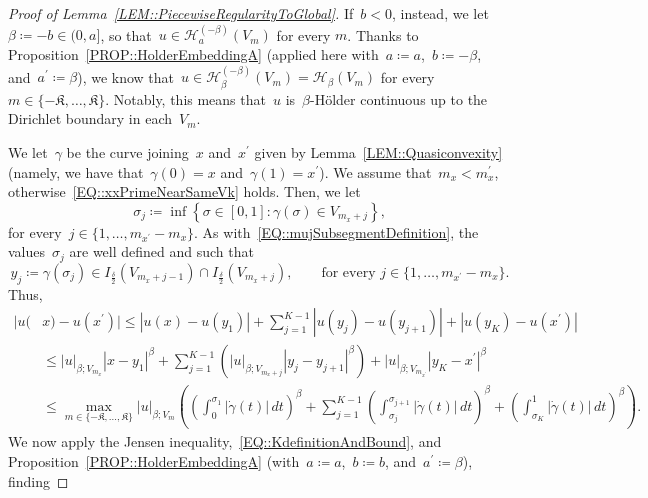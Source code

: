 \documentclass[12pt,a4paper]{amsart}
\numberwithin{equation}{section}
\theoremstyle{definition}
\theoremstyle{remark}
\newcommand{\abs}[1]{\left\lvert#1\right\rvert}
\renewcommand{\leq}{\leqslant}
\begin{document}
\begin{appendix}
\begin{proof}[Proof of Lemma~\ref{LEM::PiecewiseRegularityToGlobal}]
    If~$b<0$, instead, we let~$\beta \coloneq -b \in (0,a]$, so that~$u \in \mathcal{H}_a^{(-\beta)}(V_m)$ for every $m$. Thanks to Proposition~\ref{PROP::HolderEmbeddingA} (applied here with~$a \coloneq a$,~$b \coloneq -\beta$, and~$a^\prime \coloneq \beta$), we know that~$u \in \mathcal{H}_{\beta}^{(-\beta)}(V_m) = \mathcal{H}_{\beta}(V_m)$ for every~$m \in \{-\mathfrak{K},\dots,\mathfrak{K}\}$. Notably, this means that~$u$ is~$\beta$-Hölder continuous up to the Dirichlet boundary in each~$V_m$. %

    We let~$\gamma$ be the curve joining~$x$ and~$x^\prime$ given by Lemma~\ref{LEM::Quasiconvexity} (namely, we have that~$\gamma(0) = x$ and~$\gamma(1) = x^\prime$). We assume that~$m_x < m_x^\prime$, otherwise~\eqref{EQ::xxPrimeNearSameVk} holds. Then, we let
    \begin{equation}
        \sigma_j \coloneq \inf\left\{ \sigma \in [0,1] \colon \gamma(\sigma) \in V_{m_x+j} \right\},
    \end{equation}
    for every~$j \in \{1,\dots,m_{x^\prime}-m_x\}$. As with~\eqref{EQ::mujSubsegmentDefinition}, the values~$\sigma_j$ are well defined and such that
    \begin{equation}
        y_j \coloneq \gamma(\sigma_j)\in I_{\frac{\delta}{2}}(V_{m_x + j - 1})\cap I_{\frac{\delta}{2}}(V_{m_x + j}),\qquad \text{for every }j \in \{1,\dots,m_{x^\prime}-m_x\}.
    \end{equation}
    Thus,
    \begin{equation}
        \begin{split}
        |u(&x)-u(x^\prime)|\leq \abs{u(x)-u(y_1)} + \sum_{j=1}^{K-1} \abs{u(y_j)-u(y_{j+1})} + \abs{u(y_K)-u(x^\prime)}\\
            &\leq \abs{u}_{\beta; V_{m_x}} \abs{x-y_1}^{\beta} + \sum_{j=1}^{K-1} \left( \abs{u}_{\beta; V_{m_x+j}} \abs{y_j-y_{j+1}}^{\beta}\right) +\abs{u}_{\beta; V_{m_{x^\prime}}} \abs{y_K - x^\prime}^{\beta}\\
            &\leq \max_{m \in \{-\mathfrak{K},\dots,\mathfrak{K}\}} \abs{u}_{\beta; V_{m}} \left( {\left(\int_0^{\sigma_1}\abs{\dot{\gamma}(t)}\,dt\right)}^{\beta}+ \sum_{j=1}^{K-1} {\left(\int_{\sigma_j}^{\sigma_{j+1}}\abs{\dot{\gamma}(t)}\,dt\right)}^{\beta} + {\left(\int_{\sigma_K}^{1}\abs{\dot{\gamma}(t)}\,dt\right)}^{\beta}\right).
        \end{split}
    \end{equation}
    We now apply the Jensen inequality,~\eqref{EQ::KdefinitionAndBound}, and Proposition~\ref{PROP::HolderEmbeddingA} (with~$a \coloneq a$,~$b \coloneq b$, and~$a^\prime \coloneq \beta$), finding

\end{proof}
\end{appendix}
\end{document}
